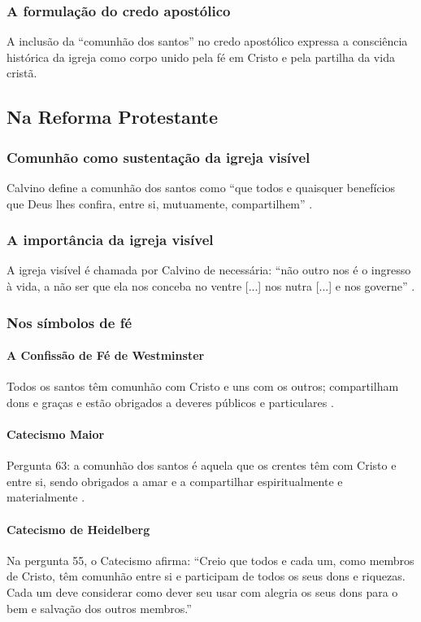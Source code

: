 \subsubsection{A formulação do credo apostólico}
A inclusão da ``comunhão dos santos'' no credo apostólico expressa a consciência histórica da igreja como corpo unido pela fé em Cristo e pela partilha da vida cristã.

\subsection{Na Reforma Protestante}

\subsubsection{Comunhão como sustentação da igreja visível}
Calvino define a comunhão dos santos como ``que todos e quaisquer benefícios que Deus lhes confira, entre si, mutuamente, compartilhem'' \cite{calvino2022}.

\subsubsection{A importância da igreja visível}
A igreja visível é chamada por Calvino de necessária: ``não outro nos é o ingresso à vida, a não ser que ela nos conceba no ventre [...] nos nutra [...] e nos governe'' \cite{calvino2022}.

\subsubsection{Nos símbolos de fé}

\paragraph{A Confissão de Fé de Westminster} 
Todos os santos têm comunhão com Cristo e uns com os outros; compartilham dons e graças e estão obrigados a deveres públicos e particulares \cite{cfw}.

\paragraph{Catecismo Maior} 
Pergunta 63: a comunhão dos santos é aquela que os crentes têm com Cristo e entre si, sendo obrigados a amar e a compartilhar espiritualmente e materialmente \cite{catecismoMaior}.

\paragraph{Catecismo de Heidelberg} 
Na pergunta 55, o Catecismo afirma: “Creio que todos e cada um, como membros de Cristo, têm comunhão entre si e participam de todos os seus dons e riquezas. Cada um deve considerar como dever seu usar com alegria os seus dons para o bem e salvação dos outros membros.” \cite{heidelberg}


